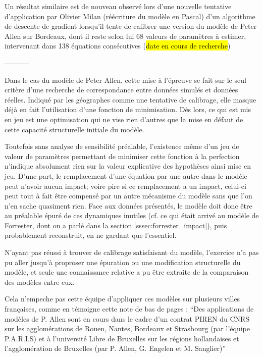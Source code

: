 Un résultat similaire est de nouveau observé lors d’une nouvelle tentative d’application par Olivier Milan (réécriture du modèle en Pascal) d’un algorithme de descente de gradient lorsqu’il tente de calibrer une version du modèle de Peter Allen sur Bordeaux, dont il reste selon lui 68 valeurs de paramètres à estimer, intervenant dans 138 équations consécutives  (\hl{date en cours de recherche})

-----------


Dans le cas du modèle de Peter Allen, cette mise à l'épreuve se fait sur le seul critère d'une recherche de correspondance entre données simulés et données réelles. Indiqué par les géographes comme une tentative de calibrage, elle masque déjà en fait l'utilisation d'une fonction de minimisation. Dès lors, ce qui est mis en jeu est une optimisation qui ne vise rien d'autres que la mise en défaut de cette capacité structurelle initiale du modèle.

Toutefois sans analyse de sensibilité préalable, l'existence même d'un jeu de valeur de paramètres permettant de minimiser cette fonction à la perfection n'indique absolument rien sur la valeur explicative des hypothèses ainsi mise en jeu. D'une part, le remplacement d'une équation par une autre dans le modèle peut n'avoir aucun impact; voire pire si ce remplacement a un impact, celui-ci peut tout à fait être compensé par un autre mécanisme du modèle sans que l'on n'en sache quasiment rien. Face aux données présentés, le modèle doit donc être au préalable épuré de ces dynamiques inutiles (cf. ce qui était arrivé au modèle de Forrester, dont on a parlé dans la section \ref{sssec:forrester_impact}), puis probablement reconstruit, en ne gardant que l'essentiel.

N'ayant pas réussi à trouver de calibrage satisfaisant du modèle, l'exercice n'a pas pu aller jusqu'à proproser une épuration ou une modification structurelle du modèle, et seule une connaissance relative a pu être extraite de la comparaison des modèles entre eux.

Cela n'empeche pas cette équipe d'appliquer ces modèles sur plusieurs villes françaises, comme en témoigne cette note de bas de pages \autocite[134]{Pumain1984} : \enquote{Des applications de modèles de P. Allen sont en cours dans le cadre d'un contrat PIREN du CNRS sur les agglomérations de Rouen, Nantes, Bordeaux et Strasbourg (par l'équipe P.A.R.I.S) et à l'université Libre de Bruxelles sur les régions hollandaises et l'agglomération de Bruxelles (par P. Allen, G. Engelen et M. Sanglier)}



